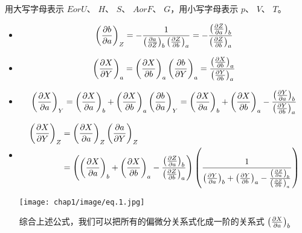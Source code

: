 \begin{corollary}
    用大写字母表示
\(E or U\)、
\(H\)、
\(S\)、
\(A or F\)、
\(G\)，用小写字母表示
\(p\)、
\(V\)、
\(T\)。
    \begin{itemize}
        \item \[
        \left(\frac{\partial b }{\partial a}\right)_Z=-\frac{1}
        {\left(\frac{\partial a}{\partial Z}\right)_b\left(\frac{\partial Z}{\partial b}\right)_a}
        =-\frac{\left(\frac{\partial Z}{\partial a}\right)_b}{\left(\frac{\partial Z}{\partial b}\right)_a}\]
        \item \[
        \left(\frac{\partial X}{\partial Y}\right)_a=\left(\frac{\partial X}{\partial b}\right)_a 
        \left(\frac{\partial b}{\partial Y}\right)_a 
        =\frac{\left(\frac{\partial X}{\partial b}\right)_a }
        {\left(\frac{\partial Y}{\partial b}\right)_a }\]
        \item \[
        \left(\frac{\partial X}{\partial a}\right)_Y =\left(\frac{\partial X}{\partial a}\right)_b 
        +\left(\frac{\partial X}{\partial b}\right)_a\left(\frac{\partial b}{\partial a}\right)_Y
        =\left(\frac{\partial X}{\partial a}\right)_b 
        +\left(\frac{\partial X}{\partial b}\right)_a
        -\frac{\left(\frac{\partial Y}{\partial a}\right)_b}{\left(\frac{\partial Y}{\partial b}\right)_a}\]
        \item 
\begin{align*}
            \left(\frac{\partial X}{\partial Y}\right)_Z 
            &=\left( \frac{\partial X}{\partial a} \right)_Z \left( \frac{\partial a}{\partial Y} \right)_Z\\
            &=\left(\left(\frac{\partial X}{\partial a}\right)_b 
            +\left(\frac{\partial X}{\partial b}\right)_a
            -\frac{\left(\frac{\partial Z}{\partial a}\right)_b}{\left(\frac{\partial Z}{\partial b}\right)_a} \right)
            \left( \frac{1}{
                \left(\frac{\partial Y}{\partial a}\right)_b 
        +\left(\frac{\partial Y}{\partial b}\right)_a
        -\frac{\left(\frac{\partial Z}{\partial a}\right)_b}{\left(\frac{\partial Z}{\partial b}\right)_a}
            }\right)
\end{align*}
            \begin{center}
                \texttt{[image: chap1/image/eq.1.jpg]}
            \end{center}
            综合上述公式，我们可以把所有的偏微分关系式化成一阶的关系式
            \(\left(\frac{\partial X}{\partial a}\right)_b\)
    \end{itemize}
\end{corollary}
